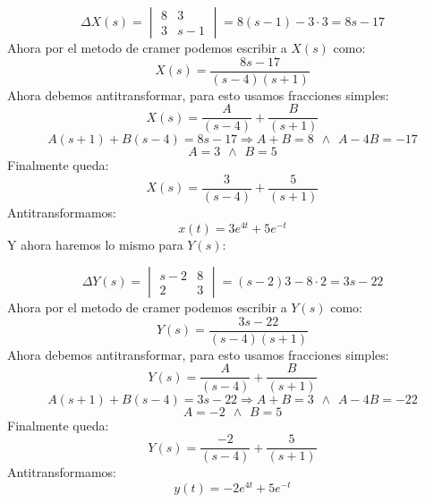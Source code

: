 \documentclass[]{article}
\begin{document}
$$
\Delta X(s)= \begin{vmatrix}
	8 & 3\\
	3 & s-1
	\end{vmatrix} = 8(s-1) - 3\cdot 3 = 8s-17
$$
Ahora por el metodo de cramer podemos escribir a $X(s)$ como:
$$
X(s) = \frac{8s-17}{(s-4)(s+1)}
$$
Ahora debemos antitransformar, para esto usamos fracciones simples:
$$
X(s) = \frac{A}{(s-4)} + \frac{B}{(s+1)}
$$
$$
A(s+1) + B(s-4) = 8s-17 \Rightarrow A+B = 8 \hspace{5pt} \wedge \hspace{5pt} A-4B = -17
$$
$$
A=3 \hspace{5pt} \wedge \hspace{5pt} B = 5
$$
Finalmente queda:
$$
X(s) = \frac{3}{(s-4)} + \frac{5}{(s+1)}
$$
Antitransformamos:
$$
x(t) = 3e^{4t} + 5e^{-t}
$$
Y ahora haremos lo mismo para $Y(s)$:

$$
\Delta Y(s)= \begin{vmatrix}
	s-2 & 8\\
	2 & 3
	\end{vmatrix} = (s-2)3 - 8\cdot 2 = 3s-22
$$
Ahora por el metodo de cramer podemos escribir a $Y(s)$ como:
$$
Y(s) = \frac{3s-22}{(s-4)(s+1)}
$$
Ahora debemos antitransformar, para esto usamos fracciones simples:
$$
Y(s) = \frac{A}{(s-4)} + \frac{B}{(s+1)}
$$
$$
A(s+1) + B(s-4) = 3s-22 \Rightarrow A+B = 3 \hspace{5pt} \wedge \hspace{5pt} A-4B = -22
$$
$$
A=-2 \hspace{5pt} \wedge \hspace{5pt} B = 5
$$
Finalmente queda:
$$
Y(s) = \frac{-2}{(s-4)} + \frac{5}{(s+1)}
$$
Antitransformamos:
$$
y(t) = -2e^{4t} + 5e^{-t}
$$
	
\end{document}

